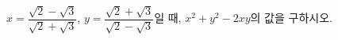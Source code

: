 $x=\dfrac{\sqrt{2}-\sqrt{3}}{\sqrt{2}+\sqrt{3}}$, $y=\dfrac{\sqrt{2}+\sqrt{3}}{\sqrt{2}-\sqrt{3}}$일 때, $x^2+y^2-2xy$의 값을 구하시오.
